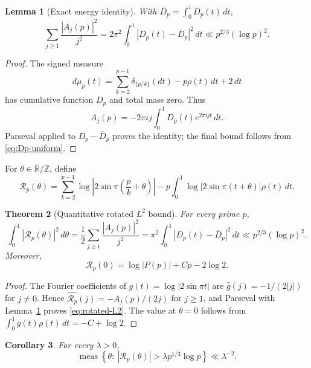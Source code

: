 \documentclass[11pt]{amsart}
\numberwithin{equation}{section}
\newtheorem{theorem}{Theorem}[section]
\newtheorem{corollary}[theorem]{Corollary}
\newtheorem{lemma}[theorem]{Lemma}
\theoremstyle{definition}
\theoremstyle{remark}
\begin{document}
\begin{lemma}[Exact energy identity]\label{lem:Aj-energy}
With \(\overline D_p=\int_0^1D_p(t)\,dt\),
\begin{equation}\label{eq:Aj-energy}
 \sum_{j\ge1}\frac{|A_j(p)|^2}{j^2}
 =2\pi^2\int_0^1|D_p(t)-\overline D_p|^2\,dt
 \ll p^{2/3}(\log p)^2.
\end{equation}
\end{lemma}

\begin{proof}
The signed measure
\[
 d\mu_p(t)=\sum_{k=2}^{p-1}\delta_{\{p/k\}}(dt)
 -p\rho(t)\,dt+2\,dt
\]
has cumulative function \(D_p\) and total mass zero.  Thus
\[
 A_j(p)=-2\pi i j\int_0^1D_p(t)e^{2\pi ijt}\,dt.
\]
Parseval applied to \(D_p-\overline D_p\) proves the identity; the final
bound follows from \eqref{eq:Dp-uniform}.
\end{proof}

For \(\theta\in\mathbb R/\mathbb Z\), define
\begin{equation}\label{eq:rotated-remainder}
 \mathscr R_p(\theta)=
 \sum_{k=2}^{p-1}\log\left|2\sin\pi\left(\frac pk+\theta\right)\right|
 -p\int_0^1\log|2\sin\pi(t+\theta)|\rho(t)\,dt.
\end{equation}

\begin{theorem}[Quantitative rotated \(L^2\) bound]\label{thm:rotated-L2}
For every prime \(p\),
\begin{equation}\label{eq:rotated-L2}
 \int_0^1|\mathscr R_p(\theta)|^2\,d\theta
 =\frac12\sum_{j\ge1}\frac{|A_j(p)|^2}{j^2}
 =\pi^2\int_0^1|D_p(t)-\overline D_p|^2\,dt
 \ll p^{2/3}(\log p)^2.
\end{equation}
Moreover,
\begin{equation}\label{eq:theta-zero-original}
 \mathscr R_p(0)=\log|P(p)|+Cp-2\log2.
\end{equation}
\end{theorem}

\begin{proof}
The Fourier coefficients of
\(g(t)=\log|2\sin\pi t|\) are
\(\widehat g(j)=-1/(2|j|)\) for \(j\ne0\).  Hence
\(\widehat{\mathscr R_p}(j)=-A_j(p)/(2j)\) for \(j\ge1\), and Parseval
with Lemma~\ref{lem:Aj-energy} proves \eqref{eq:rotated-L2}.  The value at
\(\theta=0\) follows from
\(\int_0^1g(t)\rho(t)\,dt=-C+\log2\).
\end{proof}

\begin{corollary}\label{cor:rotated-Chebyshev}
For every \(\lambda>0\),
\begin{equation}\label{eq:rotated-exceptional}
 \operatorname{meas}\left\{\theta:\ |\mathscr R_p(\theta)|>
 \lambda p^{1/3}\log p\right\}\ll\lambda^{-2}.
\end{equation}
\end{corollary}
\end{document}
